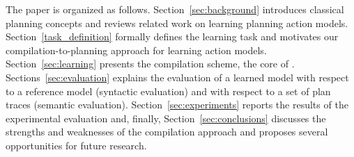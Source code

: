 The paper is organized as follows. Section~\ref{sec:background} introduces classical planning concepts and reviews related work on learning planning action models. Section~\ref{task_definition} formally defines the learning task and motivates our compilation-to-planning approach for learning action models. Section~\ref{sec:learning} presents the compilation scheme, the core of \FAMA. Sections~\ref{sec:evaluation} explains the evaluation of a learned model with respect to a reference model (syntactic evaluation) and with respect to a set of plan traces (semantic evaluation). Section~\ref{sec:experiments} reports the results of the experimental evaluation and, finally, Section~\ref{sec:conclusions} discusses the strengths and weaknesses of the compilation approach and proposes several opportunities for future research.








